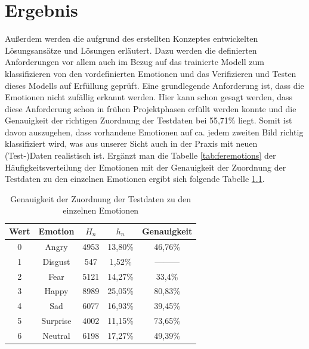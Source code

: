 \documentclass[12pt, a4paper]{report}
\begin{document}
\chapter{Ergebnis}
Außerdem werden die aufgrund des erstellten Konzeptes entwickelten Lösungsansätze und Lösungen erläutert. Dazu werden die definierten Anforderungen vor allem auch im Bezug auf das trainierte Modell zum klassifizieren von den vordefinierten Emotionen und das Verifizieren und Testen dieses Modells auf Erfüllung geprüft.\newline
Eine grundlegende Anforderung ist, dass die Emotionen nicht zufällig erkannt werden. Hier kann schon gesagt werden, dass diese Anforderung schon in frühen Projektphasen erfüllt werden konnte und die Genauigkeit der richtigen Zuordnung der Testdaten bei 55,71\% liegt. Somit ist davon auszugehen, dass vorhandene Emotionen auf ca. jedem zweiten Bild richtig klassifiziert wird, was aus unserer Sicht auch in der Praxis mit neuen (Test-)Daten realistisch ist. Ergänzt man die Tabelle \ref{tab:feremotions} der Häufigkeitsverteilung der Emotionen mit der Genauigkeit der Zuordnung der Testdaten zu den einzelnen Emotionen ergibt sich folgende Tabelle \ref{tab:genauigkeitemotions}.
\begin{table}[h]
  \centering
  \begin{tabular}[t]{c|c|c|c|c}
  Wert & Emotion & $H_n$ & $h_n$ & Genauigkeit \\
  \hline
  0 & Angry & 4953 & 13,80\% & 46,76\% \\
  1 & Disgust & 547 & 1,52\% & --------- \\
  2 & Fear & 5121 & 14,27\% & 33,4\% \\
  3 & Happy & 8989 & 25,05\% & 80,83\% \\
  4 & Sad & 6077 & 16,93\% & 39,45\% \\
  5 & Surprise & 4002 & 11,15\% & 73,65\% \\
  6 & Neutral & 6198 & 17,27\% & 49,39\% \\
  \hline
  \end{tabular}
  \caption{Genauigkeit der Zuordnung der Testdaten zu den einzelnen Emotionen}
  \label{tab:genauigkeitemotions}
\end{table} 
\end{document}
